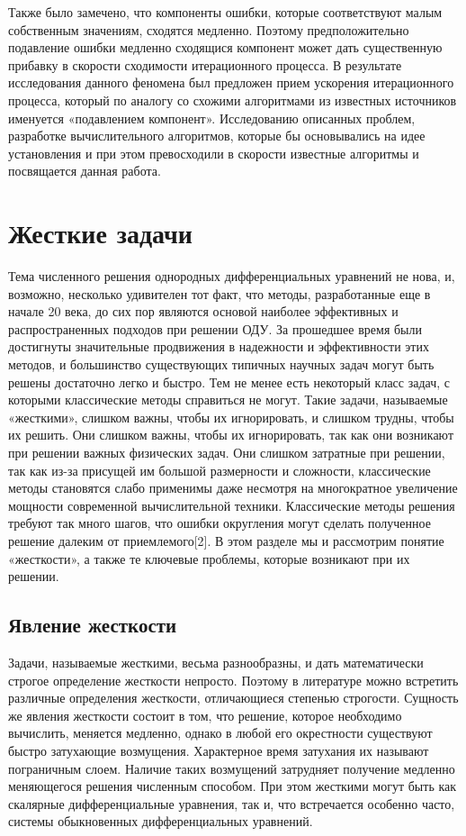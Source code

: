 \documentclass[a4paper,14pt]{extreport}
\begin{document}
Также было замечено, что компоненты ошибки, которые соответствуют малым собственным значениям, сходятся медленно. Поэтому предположительно подавление ошибки медленно сходящися компонент может дать существенную прибавку в скорости сходимости итерационного процесса. В результате исследования данного феномена был предложен прием ускорения итерационного процесса, который  по аналогу со схожими алгоритмами из известных источников именуется «подавлением компонент».
Исследованию описанных проблем, разработке вычислительного алгоритмов, которые бы основывались на идее установления и при этом превосходили в скорости известные алгоритмы и посвящается данная работа.
  \label{c:intro}


  \chapter{Жесткие задачи}
  \label{c:stiff_problems}
  Тема численного решения однородных дифференциальных уравнений не нова, и, возможно, несколько удивителен тот факт, что методы, разработанные еще в начале 20 века, до сих пор являются основой наиболее эффективных и распространенных подходов при решении ОДУ. За прошедшее время были достигнуты значительные продвижения в надежности и эффективности этих методов, и большинство существующих типичных научных задач могут быть решены достаточно легко и быстро. Тем не менее есть некоторый класс задач, с которыми классические методы справиться не могут. Такие задачи, называемые «жесткими», слишком важны, чтобы их игнорировать, и слишком трудны, чтобы их решить. Они слишком важны, чтобы их игнорировать, так как они возникают при решении важных физических задач. Они слишком затратные при решении, так как из-за присущей им большой размерности и сложности, классические методы становятся слабо применимы даже несмотря на многократное увеличение мощности современной вычислительной техники. Классические методы решения требуют так много шагов, что ошибки округления могут сделать полученное решение далеким от приемлемого[2]. В этом разделе мы и рассмотрим понятие «жесткости», а также те ключевые проблемы, которые возникают при их решении.

  \section{Явление жесткости}
  \label{s:stiffness}
  Задачи, называемые жесткими, весьма разнообразны, и дать математически строгое определение жесткости непросто. Поэтому в литературе можно встретить различные определения жесткости, отличающиеся степенью строгости. Сущность же явления жесткости состоит в том, что решение, которое необходимо вычислить, меняется медленно, однако в любой его окрестности существуют быстро затухающие возмущения. Характерное время затухания их называют пограничным слоем. Наличие таких возмущений затрудняет получение медленно меняющегося решения численным способом. При этом жесткими могут быть как скалярные дифференциальные уравнения, так и, что встречается особенно часто, системы обыкновенных дифференциальных уравнений.
  
\end{document}
